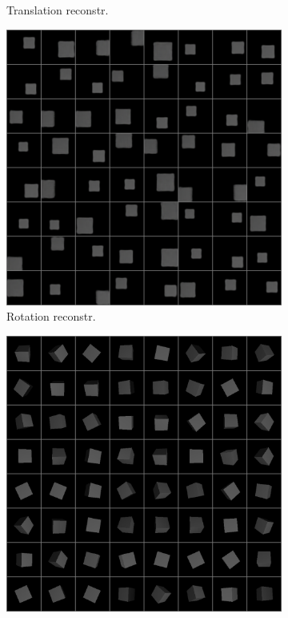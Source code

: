 \documentclass[10pt,a4paper]{article}
\begin{document}
\begin{figure}[!ht]
\begin{subfigure}{0.49\textwidth}
	\caption{Translation reconstr.}
	\label{cube_trec}
\end{subfigure}
\begin{subfigure}{0.49\textwidth}
	\centering	
	\includegraphics[width=\textwidth]{cube_output1.png}
	\caption{Rotation reconstr.}
	\label{cube_rrec}
\end{subfigure}
\begin{subfigure}{0.49\textwidth}
	\centering
	\includegraphics[width=\textwidth] {cube_target0.png}

\end{subfigure}
\end{figure}
\end{document}
